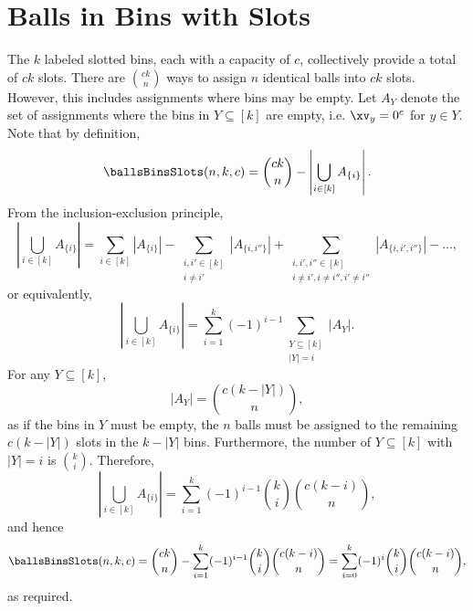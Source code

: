 \section{Balls in Bins with Slots}\label{sec:bbs}


The $k$ labeled slotted bins, each with a capacity of $c$, collectively provide a total of $ck$ slots.
There are ${ck \choose n}$ ways to assign $n$ identical balls into $ck$ slots. However, this includes assignments where bins may be empty. Let $A_{Y}$ denote the set of assignments where the bins in $Y\subseteq [k]$ are empty, i.e. $\xv_y = 0^c$ for $y\in Y$. Note that by definition, $$\ballsBinsSlots(n,k,c) = {ck \choose n} - \left|\bigcup_{i\in[k]}A_{\{i\}}\right|.$$From the inclusion-exclusion principle,$$\left|\bigcup_{i\in[k]}A_{\{i\}}\right| = \sum_{i\in[k]}|A_{\{i\}}| - \sum_{\substack{i,i'\in[k]\\i\ne i'}}|A_{\{i,i''\}}|+\sum_{\substack{i,i',i''\in[k]\\i\ne i', i\ne i'', i'\ne i''}}|A_{\{i,i',i''\}}|-\ldots,$$or equivalently,$$\left|\bigcup_{i\in[k]}A_{\{i\}}\right| =\sum_{i=1}^k(-1)^{i-1}\sum_{\substack{Y\subseteq [k]\\|Y| = i}}|A_{Y}|.$$For any $Y \subseteq [k]$,$$|A_Y| = {c(k-|Y|) \choose n},$$as if the bins in $Y$ must be empty, the $n$ balls must be assigned to the remaining $c(k-|Y|)$ slots in the $k-|Y|$ bins. Furthermore, the number of $Y \subseteq [k]$ with $|Y| = i$ is ${k \choose i}$. Therefore,$$\left|\bigcup_{i\in[k]}A_{\{i\}}\right| =\sum_{i=1}^k(-1)^{i-1}{k\choose i}{c(k-i) \choose n},$$and hence$$\ballsBinsSlots(n,k,c) = {ck \choose n} - \sum_{i=1}^k(-1)^{i-1}{k\choose i}{c(k-i) \choose n} = \sum_{i=0}^k(-1)^{i}{k\choose i}{c(k-i) \choose n},$$as required.